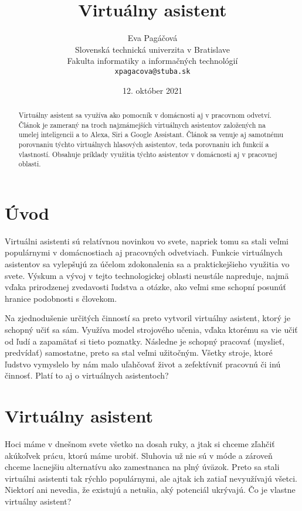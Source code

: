 \documentclass[10pt,twoside,slovak,coursepaper]{article}
\title{Virtuálny asistent}
\author{Eva Pagáčová\\[2pt]
	{\small Slovenská technická univerzita v Bratislave}\\
	{\small Fakulta informatiky a informačných technológií}\\
	{\small \texttt{xpagacova@stuba.sk}}
	}
\date{\small 12. október 2021}
\begin{document}
\maketitle

\begin{abstract}
Virtuálny asistent sa využíva ako pomocník v domácnosti aj v pracovnom odvetví. Článok je zameraný na troch najznámejších virtuálnych asistentov založených na umelej inteligencii a to Alexa, Siri a Google Assistant. Článok sa venuje aj samotnému porovnaniu týchto virtuálnych hlasových asistentov, teda porovnaniu ich funkcií a vlastností. Obsahuje príklady využitia týchto asistentov v domácnosti aj v pracovnej oblasti.
\end{abstract}

\section{Úvod}

Virtuálni asistenti sú relatívnou novinkou vo svete, napriek tomu sa stali veľmi populárnymi v domácnostiach aj pracovných odvetviach. Funkcie virtuálnych asistentov sa vylepšujú za účelom zdokonalenia sa a praktickejšieho využitia vo svete. Výskum a vývoj v tejto technologickej oblasti neustále napreduje, najmä vďaka prirodzenej zvedavosti ľudstva a otázke, ako veľmi sme schopní posunúť hranice podobnosti s človekom. 

Na zjednodušenie určitých činností sa preto vytvoril virtuálny asistent, ktorý je schopný učiť sa sám. Využíva model strojového učenia, vďaka ktorému sa vie učiť od ľudí a zapamätať si tieto poznatky. Následne je schopný pracovať (myslieť, predvídať) samostatne, preto sa stal veľmi užitočným. Všetky stroje, ktoré ľudstvo vymyslelo by nám malo uľahčovať život a zefektívniť pracovnú či inú činnosť. Platí to aj o virtuálnych asistentoch?

\section{Virtuálny asistent}

Hoci máme v dnešnom svete všetko na dosah ruky, a jtak si chceme zľahčiť akúkoľvek prácu, ktorú máme urobiť. Sluhovia už nie sú v móde a zároveň chceme lacnejšiu alternatívu ako zamestnanca na plný úväzok. Preto sa stali virtuálni asistenti tak rýchlo populárnymi, ale ajtak ich zatiaľ nevyužívajú všetci. Niektorí ani nevedia, že existujú a netušia, aký potenciál ukrývajú. Čo je vlastne virtuálny asistent?
\end{document}
